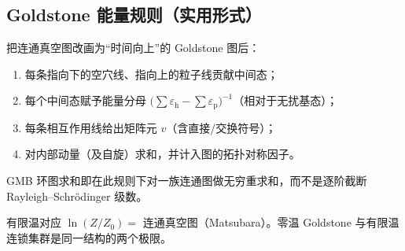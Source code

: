 \subsection{Goldstone 能量规则（实用形式）}

把连通真空图改画为“时间向上”的 Goldstone 图后：
\begin{enumerate}
  \item 每条指向下的空穴线、指向上的粒子线贡献中间态；
  \item 每个中间态赋予能量分母
  $\bigl(\sum\varepsilon_{\mathrm{h}}-\sum\varepsilon_{\mathrm{p}}\bigr)^{-1}$（相对于无扰基态）；
  \item 每条相互作用线给出矩阵元 $v$（含直接/交换符号）；
  \item 对内部动量（及自旋）求和，并计入图的拓扑对称因子。
\end{enumerate}
GMB 环图求和即在此规则下对一族连通图做无穷重求和，而不是逐阶截断 Rayleigh--Schr\"odinger 级数。

\begin{note}
有限温对应 $\ln(Z/Z_0)=$ 连通真空图（Matsubara）。零温 Goldstone 与有限温连锁集群是同一结构的两个极限。
\end{note}
